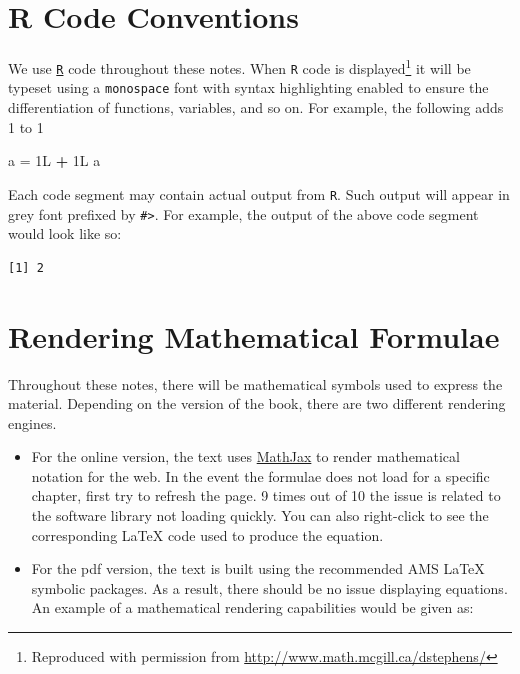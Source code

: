 \documentclass[]{book}
\makeatletter
\newenvironment{Shaded}{\begin{snugshade}}{\end{snugshade}}
\newcommand{\StringTok}[1]{\textcolor[rgb]{0.31,0.60,0.02}{#1}}
\newcommand{\OperatorTok}[1]{\textcolor[rgb]{0.81,0.36,0.00}{\textbf{#1}}}
\newcommand{\NormalTok}[1]{#1}
\providecommand{\tightlist}{%
  \setlength{\itemsep}{0pt}\setlength{\parskip}{0pt}}
\let\rmarkdownfootnote\footnote%
\def\footnote{\protect\rmarkdownfootnote}
\providecommand{\tightlist}{%
  \setlength{\itemsep}{0pt}\setlength{\parskip}{0pt}}
\newenvironment{kframe}{%
\medskip{}
\setlength{\fboxsep}{.8em}
 \def\at@end@of@kframe{}%
 \ifinner\ifhmode%
  \def\at@end@of@kframe{\end{minipage}}%
  \begin{minipage}{\columnwidth}%
 \fi\fi%
 \def\FrameCommand##1{\hskip\@totalleftmargin \hskip-\fboxsep
 \colorbox{shadecolor}{##1}\hskip-\fboxsep
     \hskip-\linewidth \hskip-\@totalleftmargin \hskip\columnwidth}%
 \MakeFramed {\advance\hsize-\width
   \@totalleftmargin\z@ \linewidth\hsize
   \@setminipage}}%
 {\par\unskip\endMakeFramed%
 \at@end@of@kframe}
\renewenvironment{Shaded}{\begin{kframe}}{\end{kframe}}
\theoremstyle{definition}
\theoremstyle{definition}
\theoremstyle{definition}
\theoremstyle{remark}
\makeatother
\begin{document}
\section*{R Code Conventions}\label{r-code-conventions}

We use \href{https://cran.r-project.org/}{\texttt{R}} code throughout
these notes. When \texttt{R} code is displayed\footnote{Reproduced with
  permission from \url{http://www.math.mcgill.ca/dstephens/}} it will be
typeset using a \texttt{monospace} font with syntax highlighting enabled
to ensure the differentiation of functions, variables, and so on. For
example, the following adds 1 to 1

\begin{Shaded}
\begin{Highlighting}[]
\NormalTok{a =}\StringTok{ }\NormalTok{1L }\OperatorTok{+}\StringTok{ }\NormalTok{1L}
\NormalTok{a}
\end{Highlighting}
\end{Shaded}

Each code segment may contain actual output from \texttt{R}. Such output
will appear in grey font prefixed by \texttt{\#\textgreater{}}. For
example, the output of the above code segment would look like so:

\begin{verbatim}
[1] 2
\end{verbatim}

\section*{Rendering Mathematical
Formulae}\label{rendering-mathematical-formulae}

Throughout these notes, there will be mathematical symbols used to
express the material. Depending on the version of the book, there are
two different rendering engines.

\begin{itemize}
\tightlist
\item
  For the online version, the text uses
  \href{https://www.mathjax.org/}{MathJax} to render mathematical
  notation for the web. In the event the formulae does not load for a
  specific chapter, first try to refresh the page. 9 times out of 10 the
  issue is related to the software library not loading quickly. You can
  also right-click to see the corresponding LaTeX code used to produce
  the equation.\\
\item
  For the pdf version, the text is built using the recommended AMS LaTeX
  symbolic packages. As a result, there should be no issue displaying
  equations. An example of a mathematical rendering capabilities would
  be given as:
\end{itemize}
\end{document}
